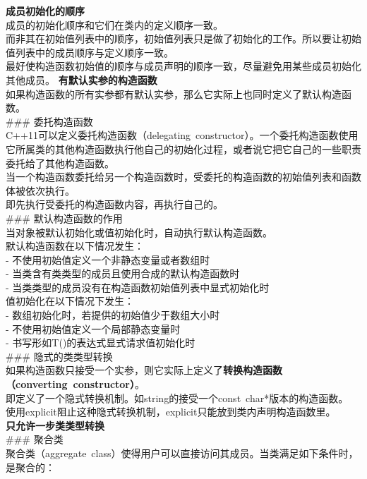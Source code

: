 \documentclass[
  a4paper,
  oneside,tablecaptionabove
]{scrbook}
\begin{document}
\textbf{成员初始化的顺序}\\
成员的初始化顺序和它们在类内的定义顺序一致。\\
而非其在初始值列表中的顺序，初始值列表只是做了初始化的工作。所以要让初始值列表中的成员顺序与定义顺序一致。\\
最好使构造函数初始值的顺序与成员声明的顺序一致，尽量避免用某些成员初始化其他成员。
\textbf{有默认实参的构造函数}\\
如果构造函数的所有实参都有默认实参，那么它实际上也同时定义了默认构造函数。\\
\#\#\# 委托构造函数\\
C++11可以定义委托构造函数（delegating~constructor）。一个委托构造函数使用它所属类的其他构造函数执行他自己的初始化过程，或者说它把它自己的一些职责委托给了其他构造函数。\\
当一个构造函数委托给另一个构造函数时，受委托的构造函数的初始值列表和函数体被依次执行。\\
\hspace*{0.333em}即先执行受委托的构造函数内容，再执行自己的。\\
\#\#\# 默认构造函数的作用\\
当对象被默认初始化或值初始化时，自动执行默认构造函数。\\
默认构造函数在以下情况发生：\\
- 不使用初始值定义一个非静态变量或者数组时\\
- 当类含有类类型的成员且使用合成的默认构造函数时\\
- 当类类型的成员没有在构造函数初始值列表中显式初始化时\\
值初始化在以下情况下发生：\\
- 数组初始化时，若提供的初始值少于数组大小时\\
- 不使用初始值定义一个局部静态变量时\\
- 书写形如T()的表达式显式请求值初始化时\\
\#\#\# 隐式的类类型转换\\
如果构造函数只接受一个实参，则它实际上定义了\textbf{转换构造函数（converting~constructor）}。\\
即定义了一个隐式转换机制。如string的接受一个const~char*版本的构造函数。\\
使用explicit阻止这种隐式转换机制，explicit只能放到类内声明构造函数里。\\
\textbf{只允许一步类类型转换}\\
\#\#\# 聚合类\\
聚合类（aggregate~class）使得用户可以直接访问其成员。当类满足如下条件时，是聚合的：\\
\end{document}

